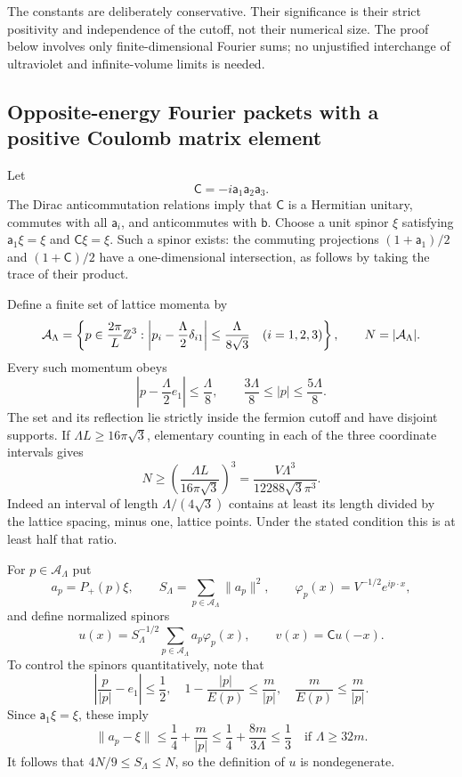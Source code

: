 The constants are deliberately conservative.  Their significance is their
strict positivity and independence of the cutoff, not their numerical size.
The proof below involves only finite-dimensional Fourier sums; no
unjustified interchange of ultraviolet and infinite-volume limits is needed.

\subsection{Opposite-energy Fourier packets with a positive Coulomb matrix element}
\label{uv-packets}

Let
\[
 \mathsf C=-i\mathsf a_1\mathsf a_2\mathsf a_3.
\]
The Dirac anticommutation relations imply that $\mathsf C$ is a Hermitian
unitary, commutes with all $\mathsf a_i$, and anticommutes with $\mathsf b$.
Choose a unit spinor $\xi$ satisfying
$\mathsf a_1\xi=\xi$ and $\mathsf C\xi=\xi$.  Such a spinor exists: the
commuting projections $(1+\mathsf a_1)/2$ and $(1+\mathsf C)/2$ have a
one-dimensional intersection, as follows by taking the trace of their
product.

Define a finite set of lattice momenta by
\begin{equation}
 \mathcal A_\Lambda=\left\{
 p\in\frac{2\pi}{L}\mathbb Z^3:
 \left|p_i-\frac\Lambda2\delta_{i1}\right|
        \le\frac\Lambda{8\sqrt3}\quad(i=1,2,3)
 \right\},\qquad N=|\mathcal A_\Lambda|.
 \label{uv-momentum-cube}
\end{equation}
Every such momentum obeys
\[
 \left|p-\frac\Lambda2e_1\right|\le\frac\Lambda8,
 \qquad \frac{3\Lambda}8\le|p|\le\frac{5\Lambda}8.
\]
The set and its reflection lie strictly inside the fermion cutoff and have
disjoint supports.  If $\Lambda L\ge16\pi\sqrt3$, elementary counting in
each of the three coordinate intervals gives
\begin{equation}
 N\ge\left(\frac{\Lambda L}{16\pi\sqrt3}\right)^3
       =\frac{V\Lambda^3}{12288\sqrt3\pi^3}.
 \label{uv-mode-count}
\end{equation}
Indeed an interval of length $\Lambda/(4\sqrt3)$ contains at least its
length divided by the lattice spacing, minus one, lattice points.  Under
the stated condition this is at least half that ratio.

For $p\in\mathcal A_\Lambda$ put
\[
 a_p=P_+(p)\xi,
 \qquad S_\Lambda=\sum_{p\in\mathcal A_\Lambda}\|a_p\|^2,
 \qquad \varphi_p(x)=V^{-1/2}e^{ip\cdot x},
\]
and define normalized spinors
\begin{equation}
 u(x)=S_\Lambda^{-1/2}\sum_{p\in\mathcal A_\Lambda}a_p\varphi_p(x),
 \qquad v(x)=\mathsf C u(-x).
 \label{uv-orbitals}
\end{equation}
To control the spinors quantitatively, note that
\[
 \left|\frac p{|p|}-e_1\right|\le\frac12,
 \quad
 1-\frac{|p|}{E(p)}\le\frac m{|p|},
 \quad \frac m{E(p)}\le\frac m{|p|}.
\]
Since $\mathsf a_1\xi=\xi$, these imply
\begin{equation}
 \|a_p-\xi\|
 \le\frac14+\frac m{|p|}
 \le\frac14+\frac{8m}{3\Lambda}\le\frac13
 \quad\text{if }\Lambda\ge32m.
 \label{uv-spin-bound}
\end{equation}
It follows that $4N/9\le S_\Lambda\le N$, so the definition of $u$ is
nondegenerate.

